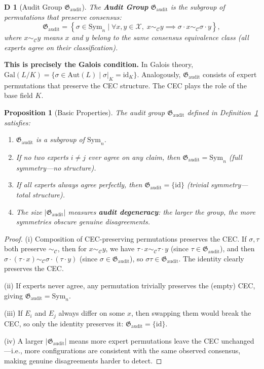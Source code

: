 \documentclass[12pt,a4paper]{article}
\newtheorem{proposition}[theorem]{Proposition}
\newtheorem{definition}[theorem]Definition
\theoremstyle{remark}
\newcommand{\Gal}{\mathrm{Gal}}
\newcommand{\Aut}{\mathrm{Aut}}
\newcommand{\Sym}{\mathrm{Sym}}
\newcommand{\AuditGrp}{\mathfrak{G}_{\mathrm{audit}}}
\newcommand{\CEC}{\mathcal{C}}
\newcommand{\ClaimSpace}{\mathcal{X}}
\begin{document}
\begin{definition}[Audit Group \(\AuditGrp\)]\label{def:audit_group}
The \textbf{Audit Group} \(\AuditGrp\) is the subgroup of permutations that preserve consensus:
\begin{equation}\label{eq:audit_group_def}
    \AuditGrp = \left\{ \sigma \in \Sym_n \mid
    \forall x, y \in \ClaimSpace,\; x \sim_{\CEC} y \implies \sigma\cdot x \sim_{\CEC} \sigma\cdot y \right\},
\end{equation}
where \(x \sim_{\CEC} y\) means \(x\) and \(y\) belong to the same consensus equivalence class (all experts agree on their classification).
\end{definition}

\textbf{This is precisely the Galois condition.} In Galois theory, \(\Gal(L/K) = \{\sigma \in \Aut(L) \mid \sigma|_K = \mathrm{id}_K\}\). Analogously, \(\AuditGrp\) consists of expert permutations that preserve the CEC structure. The CEC plays the role of the base field \(K\).

\begin{proposition}[Basic Properties]\label{prop:basic}
The audit group \(\AuditGrp\) defined in Definition~\ref{def:audit_group} satisfies:
\begin{enumerate}[label=(\roman*),itemsep=3pt]
    \item \(\AuditGrp\) is a subgroup of \(\Sym_n\).
    \item If no two experts \(i \neq j\) ever agree on any claim, then \(\AuditGrp = \Sym_n\) (full symmetry---no structure).
    \item If all experts always agree perfectly, then \(\AuditGrp = \{\mathrm{id}\}\) (trivial symmetry---total structure).
    \item The size \(|\AuditGrp|\) measures \textbf{audit degeneracy}: the larger the group, the more symmetries obscure genuine disagreements.
\end{enumerate}
\end{proposition}
\begin{proof}
(i) Composition of CEC-preserving permutations preserves the CEC. If \(\sigma, \tau\) both preserve \(\sim_{\CEC}\), then for \(x \sim_{\CEC} y\), we have \(\tau \cdot x \sim_{\CEC} \tau \cdot y\) (since \(\tau \in \AuditGrp\)), and then \(\sigma\cdot(\tau\cdot x) \sim_{\CEC} \sigma\cdot(\tau\cdot y)\) (since \(\sigma \in \AuditGrp\)), so \(\sigma\tau \in \AuditGrp\). The identity clearly preserves the CEC.

(ii) If experts never agree, any permutation trivially preserves the (empty) CEC, giving \(\AuditGrp = \Sym_n\).

(iii) If \(E_i\) and \(E_j\) always differ on some \(x\), then swapping them would break the CEC, so only the identity preserves it: \(\AuditGrp = \{\mathrm{id}\}\).

(iv) A larger \(|\AuditGrp|\) means more expert permutations leave the CEC unchanged---i.e., more configurations are consistent with the same observed consensus, making genuine disagreements harder to detect.
\end{proof}
\end{document}
